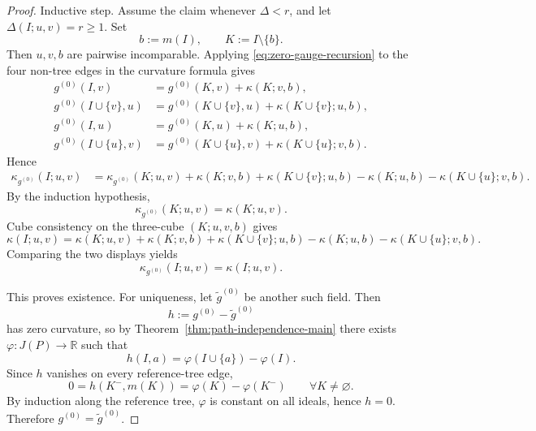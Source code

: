 \documentclass[10pt,a4paper]{amsart}
\newcommand{\RR}{\mathbb R}
\providecommand{\paragraph}{}
\begin{document}
\begin{proof}
\paragraph{Inductive step.}
Assume the claim whenever \(\Delta<r\), and let \(\Delta(I;u,v)=r\ge 1\). Set
\[
b:=m(I),\qquad K:=I\setminus\{b\}.
\]
Then \(u,v,b\) are pairwise incomparable. Applying \eqref{eq:zero-gauge-recursion} to the four non-tree edges in the curvature formula gives
\begin{align*}
g^{(0)}(I,v)&=g^{(0)}(K,v)+\kappa(K;v,b),\\
g^{(0)}(I\cup\{v\},u)&=g^{(0)}(K\cup\{v\},u)+\kappa(K\cup\{v\};u,b),\\
g^{(0)}(I,u)&=g^{(0)}(K,u)+\kappa(K;u,b),\\
g^{(0)}(I\cup\{u\},v)&=g^{(0)}(K\cup\{u\},v)+\kappa(K\cup\{u\};v,b).
\end{align*}
Hence
\begin{align*}
\kappa_{g^{(0)}}(I;u,v)
&=
\kappa_{g^{(0)}}(K;u,v)
+\kappa(K;v,b)+\kappa(K\cup\{v\};u,b)-\kappa(K;u,b)-\kappa(K\cup\{u\};v,b).
\end{align*}
By the induction hypothesis,
\[
\kappa_{g^{(0)}}(K;u,v)=\kappa(K;u,v).
\]
Cube consistency on the three-cube \((K;u,v,b)\) gives
\[
\kappa(I;u,v)
=
\kappa(K;u,v)
+\kappa(K;v,b)+\kappa(K\cup\{v\};u,b)-\kappa(K;u,b)-\kappa(K\cup\{u\};v,b).
\]
Comparing the two displays yields
\[
\kappa_{g^{(0)}}(I;u,v)=\kappa(I;u,v).
\]

This proves existence. For uniqueness, let \(\tilde g^{(0)}\) be another such field. Then
\[
h:=g^{(0)}-\tilde g^{(0)}
\]
has zero curvature, so by Theorem~\ref{thm:path-independence-main} there exists \(\varphi:J(P)\to\RR\) such that
\[
h(I,a)=\varphi(I\cup\{a\})-\varphi(I).
\]
Since \(h\) vanishes on every reference-tree edge,
\[
0=h(K^-,m(K))=\varphi(K)-\varphi(K^-)
\qquad \forall K\neq \varnothing.
\]
By induction along the reference tree, \(\varphi\) is constant on all ideals, hence \(h=0\). Therefore \(g^{(0)}=\tilde g^{(0)}\).
\end{proof}
\end{document}

